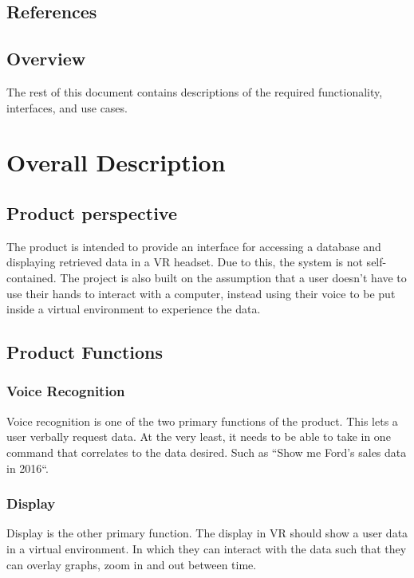 \documentclass[onecolumn, draftclsnofoot,10pt, compsoc]{IEEEtran}
\begin{document}
    \subsection{References}
        
        
    
    \subsection{Overview}
        The rest of this document contains descriptions of the required functionality, interfaces, and use cases.
    \section{Overall Description}
    
    \subsection{Product perspective}
        The product is intended to provide an interface for accessing a database and displaying retrieved data in a VR headset. Due to this, the system is not self-contained. The project is also built on the assumption that a user doesn’t have to use their hands to interact with a computer, instead using their voice to be put inside a virtual environment to experience the data.
    
    \subsection{Product Functions}
    
        \subsubsection{Voice Recognition}
            Voice recognition is one of the two primary functions of the product. This lets a user verbally request data. At the very least, it needs to be able to take in one command that correlates to the data desired. Such as ``Show me Ford’s sales data in 2016``. 
    
        \subsubsection{Display}
            Display is the other primary function. The display in VR should show a user data in a virtual environment. In which they can interact with the data such that they can overlay graphs, zoom in and out between time. 
    
\end{document}
